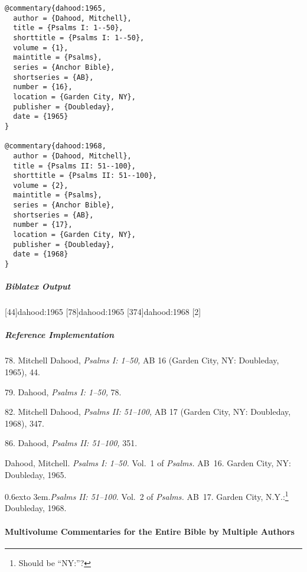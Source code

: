 \documentclass[a4paper]{article}
\newcommand*{\refbibnamedash}{%
  \leavevmode\raise 0.6ex\hbox to 3em{\hrulefill}.\space}
\newenvironment{biboutput}{%
  \subparagraph{Biblatex Output}
}{\color{black}}
\newenvironment{refimp}{%
  \subparagraph{Reference Implementation}
  \color{reference-colour}
  \rm
}{\par\color{black}}
\begin{document}
\medskip

\begin{lstlisting}
@commentary{dahood:1965,
  author = {Dahood, Mitchell},
  title = {Psalms I: 1--50},
  shorttitle = {Psalms I: 1--50},
  volume = {1},
  maintitle = {Psalms},
  series = {Anchor Bible},
  shortseries = {AB},
  number = {16},
  location = {Garden City, NY},
  publisher = {Doubleday},
  date = {1965}
}

@commentary{dahood:1968,
  author = {Dahood, Mitchell},
  title = {Psalms II: 51--100},
  shorttitle = {Psalms II: 51--100},
  volume = {2},
  maintitle = {Psalms},
  series = {Anchor Bible},
  shortseries = {AB},
  number = {17},
  location = {Garden City, NY},
  publisher = {Doubleday},
  date = {1968}
}
\end{lstlisting}

\begin{biboutput}
  [44]{dahood:1965}
  [78]{dahood:1965}
  [374]{dahood:1968}
  [2]{%
    }
\end{biboutput}

\begin{refimp}
  \hspace*{\bibindent}78. Mitchell Dahood, \emph{Psalms I: 1–50,} AB 16
  (Garden City, NY: Doubleday, 1965), 44.

  \hspace*{\bibindent}79. Dahood, \emph{Psalms I: 1–50,} 78.

  \hspace*{\bibindent}82. Mitchell Dahood, \emph{Psalms II: 51–100,} AB 17
  (Garden City, NY: Doubleday, 1968), 347.

  \hspace*{\bibindent}86. Dahood, \emph{Psalms II: 51–100,} 351.

  \hangindent\bibindent Dahood, Mitchell. \emph{Psalms I: 1–50.} Vol.~1 of
  \emph{Psalms.} AB~16. Garden City, NY: Doubleday, 1965.

  \hangindent\bibindent\refbibnamedash \emph{Psalms II: 51–100.} Vol.~2 of
  \emph{Psalms.} AB~17. Garden City, N.Y.:\footnote{Should be “NY:”?}
  Doubleday, 1968.

\end{refimp}

\paragraph{Multivolume Commentaries for the Entire Bible by Multiple Authors}
\end{document}
